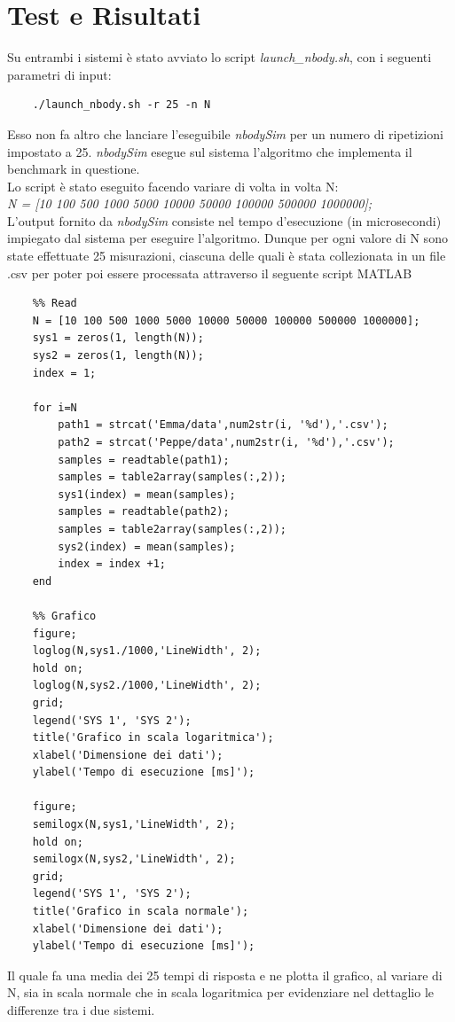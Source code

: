 \section{Test e Risultati}
Su entrambi i sistemi è stato avviato lo script \textit{launch\_nbody.sh}, con i seguenti parametri di input:
\begin{verbatim}
	./launch_nbody.sh -r 25 -n N
\end{verbatim}
Esso non fa altro che lanciare l'eseguibile \textit{nbodySim} per un numero di ripetizioni impostato a 25. 
\textit{nbodySim} esegue sul sistema l'algoritmo che implementa il benchmark in questione.
\\
Lo script è stato eseguito facendo variare di volta in volta N:
\\
\textit{N = [10 100 500 1000 5000 10000 50000 100000 500000 1000000];}
\\
L'output fornito da \textit{nbodySim} consiste nel tempo d'esecuzione (in microsecondi) impiegato dal sistema per eseguire l'algoritmo. 
Dunque per ogni valore di N sono state effettuate 25 misurazioni, ciascuna delle quali è stata collezionata in un file .csv per poter poi essere processata attraverso il seguente script MATLAB
\begin{verbatim}
	%% Read 
	N = [10 100 500 1000 5000 10000 50000 100000 500000 1000000];
	sys1 = zeros(1, length(N));
	sys2 = zeros(1, length(N));
	index = 1;
	
	for i=N
		path1 = strcat('Emma/data',num2str(i, '%d'),'.csv');
		path2 = strcat('Peppe/data',num2str(i, '%d'),'.csv');
		samples = readtable(path1);
		samples = table2array(samples(:,2));
		sys1(index) = mean(samples);
		samples = readtable(path2);
		samples = table2array(samples(:,2));
		sys2(index) = mean(samples);
		index = index +1;
	end
	
	%% Grafico
	figure;
	loglog(N,sys1./1000,'LineWidth', 2);
	hold on;
	loglog(N,sys2./1000,'LineWidth', 2);
	grid;
	legend('SYS 1', 'SYS 2');
	title('Grafico in scala logaritmica');
	xlabel('Dimensione dei dati');
	ylabel('Tempo di esecuzione [ms]');
	
	figure;
	semilogx(N,sys1,'LineWidth', 2);
	hold on;
	semilogx(N,sys2,'LineWidth', 2);
	grid;
	legend('SYS 1', 'SYS 2');
	title('Grafico in scala normale');
	xlabel('Dimensione dei dati');
	ylabel('Tempo di esecuzione [ms]');
\end{verbatim}
Il quale fa una media dei 25 tempi di risposta e ne plotta il grafico, al variare di N, sia in scala normale che in scala logaritmica per evidenziare nel dettaglio le differenze tra i due sistemi.
